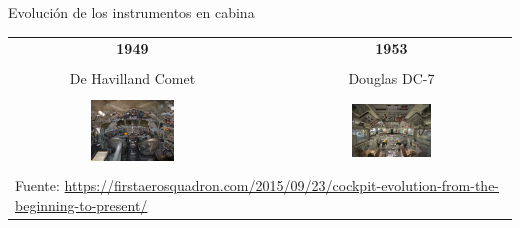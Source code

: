 \begin{frame}{Evoluci\'on de los instrumentos en cabina}
  
  \begin{tabular}{ccc}
    {\bf \large 1949} & & {\bf \large 1953} \\ & & \\
	{De Havilland Comet } & & {Douglas DC-7} \\ & & \\
    \includegraphics[width=0.35\textwidth]{imagenes/1.1.introduccion/012-de-havilland-dh-106-comet-1st-commercial-jet-airliner.jpg}
	& \hspace{5mm}
	&\includegraphics[width=0.35\textwidth]{imagenes/1.1.introduccion/015-douglas-dc-7.jpg} \\ & & \\
	\multicolumn{3}{l}{
	{\tiny Fuente: \url{https://firstaerosquadron.com/2015/09/23/cockpit-evolution-from-the-beginning-to-present/}}
}
	\\
  \end{tabular}

\end{frame}


